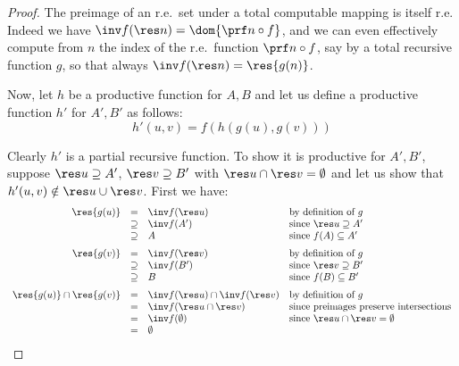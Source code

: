 \documentclass[runningheads]{amsart}
\begin{document}
\begin{proof}
The preimage of an r.e.\ set under a total computable mapping is itself r.e.
Indeed we have $\inv f (\res n) = \dom {\prf n \circ f}$, and we can even effectively compute from $n$ the index of the r.e.\ function $\prf n\circ f $, say by a total recursive function $g$, so that always $\inv f(\res n) = \res {g(n)}$.

Now, let $h$ be a productive function for $A,B$ and let us define a productive function $h'$ for $A',B'$ as follows: \[h'(u,v) = f(h(g(u), g(v)))\] 

Clearly $h'$ is a partial recursive function.
To show it is productive for $A',B'$, suppose
  $\res u \supseteq A'$, $\res v \supseteq B'$ with
  $\res u \cap \res v = \emptyset$ and let us show that $h'(u,v) \notin \res u \cup \res v$. 
First we have:
\[
\begin{array}{rcll}
     \res{g(u)} & = & \inv f (\res u ) & \text{by definition of $g$} \\
        & \supseteq & \inv f (A') & \text{since $\res u \supseteq A'$} \\
        & \supseteq & A & \text{since $f(A) \subseteq A'$} \\
    \noalign{\medskip}
    \res{g(v)} & = & \inv f (\res v ) & \text{by definition of $g$} \\
        & \supseteq & \inv f (B') & \text{since $\res v \supseteq B'$} \\
        & \supseteq & B & \text{since $f(B) \subseteq B'$} \\
    \noalign{\medskip}
    \res{g(u)} \cap \res{g(v)} & = & \inv f (\res u) \cap \inv f (\res v) & \text{by definition of $g$} \\
        & = & \inv f (\res u \cap \res v ) & \text{since preimages preserve intersections}\\
        & = & \inv f (\emptyset) & \text{since $\res u \cap \res v = \emptyset$} \\
        & = & \emptyset
\end{array}
\]




\end{proof}
\end{document}
